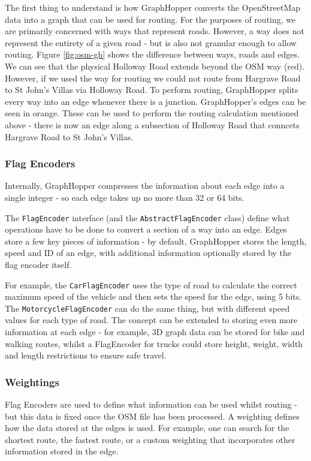\documentclass[ %
                    author={Alexander Hill},
                supervisor={Dr. Benjamin Sach},
                    degree={MEng},
                     title={MARMOSET},
                  subtitle={Multi-Agent Route Management using Online Simulation for Efficient Transportation},
                      type={research},
                      year={2016} ]{dissertation}
\begin{document}
The first thing to understand is how GraphHopper converts the OpenStreetMap data
into a graph that can be used for routing.
For the purposes of routing, we are primarily concerned with ways that represent
roads. However, a way does not represent the entirety of a given road - but is
also not granular enough to allow routing. Figure \ref{fig:osm-gh} shows the
difference between ways, roads and edges. We can see that the physical Holloway Road extends
beyond the OSM way (red). However, if we used the way for routing we could not
route from Hargrave Road to St John's Villas via Holloway Road. To perform
routing, GraphHopper splits every way into an edge whenever there is a
junction. GraphHopper's edges can be seen in orange. These can be used to perform the
routing calculation mentioned above - there is now an edge along a subsection of
Holloway Road that conncets Hargrave Road to St John's Villas.

\subsubsection{Flag Encoders}

Internally, GraphHopper compresses the information about each edge into a
single integer - so each edge takes up no more than 32 or 64 bits.

The \texttt{FlagEncoder} interface (and the \texttt{AbstractFlagEncoder} class) define what
operations have to be done to convert a section of a way into an edge. Edges
store a few key pieces of information - by default, GraphHopper stores the
length, speed and ID of an edge, with additional information optionally stored
by the flag encoder itself.

For example, the \texttt{CarFlagEncoder} uses the type of road to calculate the
correct maximum speed of the vehicle and then sets the speed for the edge, using
5 bits. The \texttt{MotorcycleFlagEncoder} can do the same thing, but with
different speed values for each type of road. The concept can be extended to
storing even more information at each edge - for example, 3D graph data can be
stored for bike and walking routes, whilst a FlagEncoder for trucks could store
height, weight, width and length restrictions to ensure safe travel.

\subsubsection{Weightings}

Flag Encoders are used to define what information can be used whilst routing -
but this data is fixed once the OSM file has been processed. A weighting defines
how the data stored at the edges is used. For example, one can search for the
shortest route, the fastest route, or a custom weighting that incorporates other
information stored in the edge.
\end{document}
